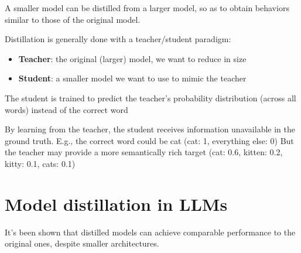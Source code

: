 A smaller model can be distilled from a larger model, so as to obtain behaviors similar to those of the original model.

Distillation is generally done with a teacher/student paradigm:

\begin{itemize}
  \item \textbf{Teacher}: the original (larger) model, we want to reduce in size
  \item \textbf{Student}: a smaller model we want to use to mimic the teacher
\end{itemize}

The student is trained to predict the teacher's probability distribution (across all words) instead of the correct word

By learning from the teacher, the student receives information unavailable in the ground truth.
E.g., the correct word could be cat (cat: 1, everything else: 0)
But the teacher may provide a more semantically rich target  (cat: 0.6, kitten: 0.2, kitty: 0.1, cats: 0.1)


\section{Model distillation in LLMs}
It's been shown that distilled models can achieve comparable
performance to the original ones, despite smaller architectures.
















